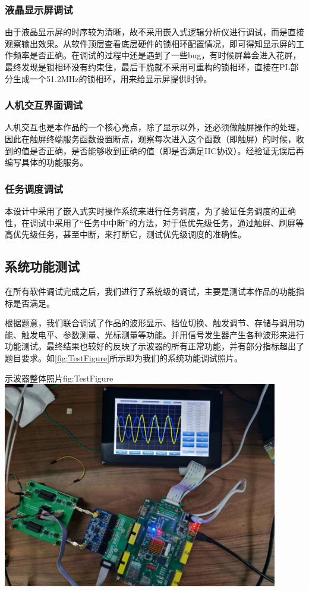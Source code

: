 \documentclass[supercite]{HustGraduPaper}
\begin{document}
	\subsubsection{液晶显示屏调试}

	由于液晶显示屏的时序较为清晰，故不采用嵌入式逻辑分析仪进行调试，而是直接观察输出效果。从软件顶层查看底层硬件的锁相环配置情况，即可得知显示屏的工作频率是否正确。在调试的过程中还是遇到了一些bug，有时候屏幕会进入花屏，最终发现是锁相环没有约束住，最后干脆就不采用可重构的锁相环，直接在PL部分生成一个51.2MHz的锁相环，用来给显示屏提供时钟。
	
	
	\subsubsection{人机交互界面调试}
	人机交互也是本作品的一个核心亮点，除了显示以外，还必须做触屏操作的处理，因此在触屏终端服务函数设置断点，观察每次进入这个函数（即触屏）的时候，收到的值是否正确，是否能够收到正确的值（即是否满足IIC协议）。经验证无误后再编写具体的功能服务。
	
	\subsubsection{任务调度调试}
	本设计中采用了嵌入式实时操作系统来进行任务调度，为了验证任务调度的正确性，在调试中采用了“任务中中断”的方法，对于低优先级任务，通过触屏、刷屏等高优先级任务，甚至中断，来打断它，测试优先级调度的准确性。
	
	\subsection{系统功能测试}
	在所有软件调试完成之后，我们进行了系统级的调试，主要是测试本作品的功能指标是否满足。
	
	根据题意，我们联合调试了作品的波形显示、挡位切换、触发调节、存储与调用功能、触发电平、参数测量、光标测量等功能。并用信号发生器产生各种波形来进行功能测试。最终结果也较好的反映了示波器的所有正常功能，并有部分指标超出了题目要求。如\autoref{fig:TestFigure}所示即为我们的系统功能调试照片。
	
	\begin{generalfig}[htb]{示波器整体照片}{fig:TestFigure}
		\includegraphics[width=12cm]{Figures/TestFigure.jpg}
	\end{generalfig}
	
\end{document}
